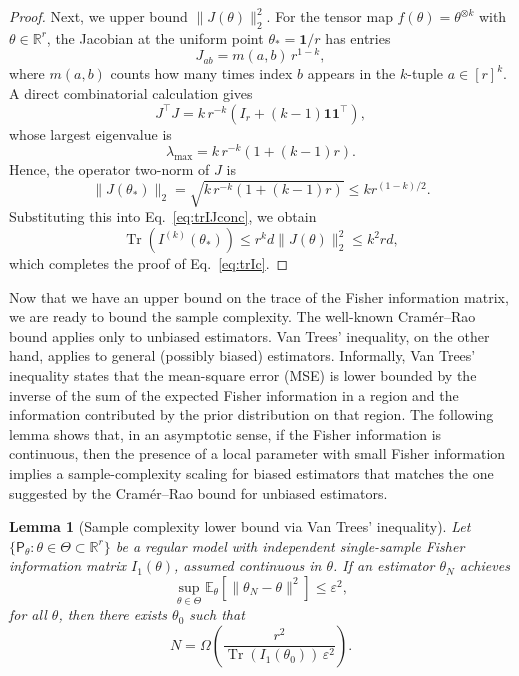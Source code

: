 \documentclass[12pt]{article}
\newtheorem{lemma}{Lemma}
\begin{document}
\begin{proof}
Next, we upper bound $\| J(\theta) \|_2^2$.
For the tensor map $f(\theta) = \theta^{\otimes k}$ with $\theta \in \mathbb{R}^r$, 
the Jacobian at the uniform point $\theta_* = \mathbf{1}/r$ has entries
\begin{equation}
    J_{ab} = m(a,b)\,r^{1-k},
\end{equation}
where $m(a,b)$ counts how many times index $b$ appears in the $k$-tuple $a \in [r]^k$.
A direct combinatorial calculation gives
\begin{equation}
    J^\top J = k\,r^{-k}\!\left(I_r + (k-1)\mathbf{1}\mathbf{1}^\top\right),
\end{equation}
whose largest eigenvalue is
\begin{equation}
    \lambda_{\max} = k\,r^{-k}\!\left(1 + (k-1)r\right).
\end{equation}
Hence, the operator two-norm of $J$ is
\begin{equation}
    \|J(\theta_*)\|_2
    = \sqrt{k\,r^{-k}\!\left(1 + (k-1)r\right)} \le k r^{(1-k)/2}.
\end{equation}
Substituting this into Eq.~\ref{eq:trIJconc}, we obtain
\begin{equation}
    \operatorname{Tr}(I^{(k)}(\theta_*)) \le r^k d  \| J(\theta) \|_2^2 \le k^2 r d,
\end{equation}
which completes the proof of Eq.~\ref{eq:trIc}.
\end{proof}

Now that we have an upper bound on the trace of the Fisher information matrix, we are ready to bound the sample complexity. The well-known Cramér--Rao bound applies only to unbiased estimators. Van Trees' inequality, on the other hand, applies to general (possibly biased) estimators. Informally, Van Trees' inequality states that the mean-square error (MSE) is lower bounded by the inverse of the sum of the expected Fisher information in a region and the information contributed by the prior distribution on that region. The following lemma shows that, in an asymptotic sense, if the Fisher information is continuous, then the presence of a local parameter with small Fisher information implies a sample-complexity scaling for biased estimators that matches the one suggested by the Cramér--Rao bound for unbiased estimators.

\begin{lemma}[Sample complexity lower bound via Van Trees' inequality]\label{lm:vt}
Let $\{\mathsf{P}_\theta : \theta \in \Theta \subset \mathbb{R}^r\}$ be a regular model with independent single-sample Fisher information matrix $I_1(\theta)$, assumed continuous in $\theta$. 
If an estimator $\theta_N$ achieves 
\begin{equation}
    \sup_{\theta\in\Theta}\mathbb{E}_\theta\!\left[\|\theta_N-\theta\|^2\right] \le \varepsilon^2,
\end{equation}
for all $\theta$, then there exists $\theta_0$ such that 
\begin{equation}
    N = \Omega\!\left(\frac{r^2}{\operatorname{Tr}(I_1(\theta_0))\,\varepsilon^2}\right).
\end{equation}
\end{lemma}
\end{document}
